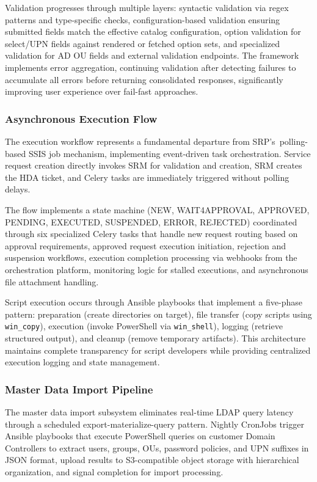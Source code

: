Validation progresses through multiple layers: syntactic validation via regex patterns and type-specific checks, configuration-based validation ensuring submitted fields match the effective catalog configuration, option validation for select/UPN fields against rendered or fetched option sets, and specialized validation for AD OU fields and external validation endpoints. The framework implements error aggregation, continuing validation after detecting failures to accumulate all errors before returning consolidated responses, significantly improving user experience over fail-fast approaches.

\subsubsection{Asynchronous Execution Flow}

The execution workflow represents a fundamental departure from SRP's~polling-based SSIS job mechanism, implementing event-driven task orchestration. Service request creation directly invokes SRM for validation and creation, SRM creates the HDA ticket, and Celery tasks are immediately triggered without polling delays.

The flow implements a state machine (NEW, WAIT4APPROVAL, APPROVED, PENDING, EXECUTED, SUSPENDED, ERROR, REJECTED) coordinated through six specialized Celery tasks that handle new request routing based on approval requirements, approved request execution initiation, rejection and suspension workflows, execution completion processing via webhooks from the orchestration platform, monitoring logic for stalled executions, and asynchronous file attachment handling.

Script execution occurs through Ansible playbooks that implement a five-phase pattern: preparation (create directories on target), file transfer (copy scripts using \texttt{win\_copy}), execution (invoke PowerShell via \texttt{win\_shell}), logging (retrieve structured output), and cleanup (remove temporary artifacts). This architecture maintains complete transparency for script developers while providing centralized execution logging and state management.

\subsubsection{Master Data Import Pipeline}

The master data import subsystem eliminates real-time LDAP query latency through a scheduled export-materialize-query pattern. Nightly CronJobs trigger Ansible playbooks that execute PowerShell queries on customer Domain Controllers to extract users, groups, OUs, password policies, and UPN suffixes in JSON format, upload results to S3-compatible object storage with hierarchical organization, and signal completion for import processing.

